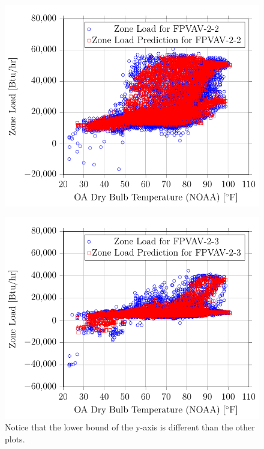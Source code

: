 \begin{figure}
    \centering
    \includegraphics{Plots/05/2017-06-27-1012-BtuhrvsOADryBulbTemperatureNOAAF.pdf}
    \caption{}
    \label{fig:2017-06-27-1012-BtuhrvsOADryBulbTemperatureNOAAF}
\end{figure}

\begin{figure}
\centering
\includegraphics{Plots/06/2017-06-27-1018-BtuhrvsOADryBulbTemperatureNOAAF.pdf}
\caption{ Notice that the lower
bound of the y-axis is different than the other plots. }
\label{fig:2017-06-27-1018-BtuhrvsOADryBulbTemperatureNOAAF}
\end{figure}


